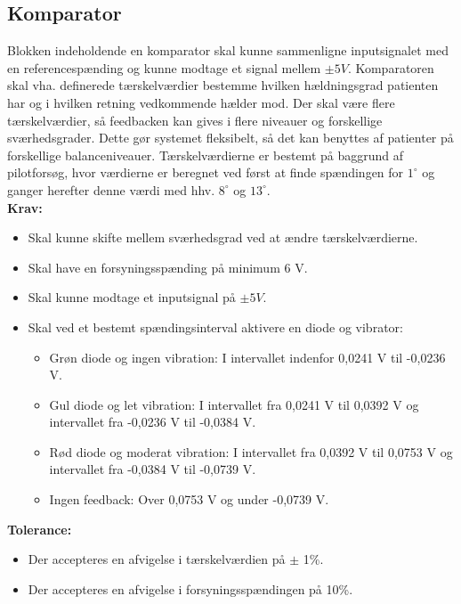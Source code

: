 \subsection{Komparator}\label{KomparatorAfs} 
Blokken indeholdende en komparator skal kunne sammenligne inputsignalet med en referencespænding og kunne modtage et signal mellem $\pm 5 V$. Komparatoren skal vha. definerede tærskelværdier bestemme hvilken hældningsgrad patienten har og i hvilken retning vedkommende hælder mod. Der skal være flere tærskelværdier, så feedbacken kan gives i flere niveauer og forskellige sværhedsgrader. Dette gør systemet fleksibelt, så det kan benyttes af patienter på forskellige balanceniveauer. Tærskelværdierne er bestemt på baggrund af pilotforsøg, hvor værdierne er beregnet ved først at finde spændingen for $1^{\circ}$ og ganger herefter denne værdi med hhv. $8^{\circ}$ og $13^{\circ}$.\\
\textbf{Krav:} 
\begin{itemize}
	\item Skal kunne skifte mellem sværhedsgrad ved at ændre tærskelværdierne.
	\item Skal have en forsyningsspænding på minimum 6 V.
	\item Skal kunne modtage et inputsignal på $\pm 5 V$. 
	\item Skal ved et bestemt spændingsinterval aktivere en diode og vibrator:
	\begin{itemize}
		\item Grøn diode og ingen vibration: I intervallet indenfor 0,0241 V til -0,0236 V.
		\item Gul diode og let vibration: I intervallet fra 0,0241 V til 0,0392 V og intervallet fra -0,0236 V til -0,0384 V.
		\item Rød diode og moderat vibration: I intervallet fra 0,0392 V til 0,0753 V og intervallet fra -0,0384 V til -0,0739 V.
		\item Ingen feedback: Over 0,0753 V og under -0,0739 V. 
	\end{itemize}
\end{itemize}
\textbf{Tolerance:}
\begin{itemize}
	\item Der accepteres en afvigelse i tærskelværdien på $\pm$ 1\%.
	\item Der accepteres en afvigelse i forsyningsspændingen på 10\%.
\end{itemize}
